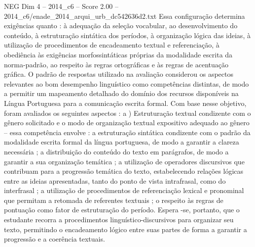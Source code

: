 \begin{textsample}{NEG Dim 4 – 2014\_c6 – Score 2.00 – 2014\_c6/enade\_2014\_arqui\_urb\_dc542636d2.txt}
Essa configuração determina exigências quanto : à adequação da seleção vocabular, ao desenvolvimento do conteúdo, à estruturação sintática dos períodos, à organização lógica das ideias, à utilização de procedimentos de encadeamento textual e referenciação, à obediência às exigências morfossintáticas próprias da modalidade escrita da norma-padrão, ao respeito às regras ortográficas e às regras de acentuação gráfica.
O padrão de respostas utilizado na avaliação considerou os aspectos relevantes ao bom desempenho linguístico como competências distintas, de modo a permitir um mapeamento detalhado do domínio dos recursos disponíveis na Língua Portuguesa para a comunicação escrita formal.
Com base nesse objetivo, foram avaliados os seguintes aspectos : a ) Estruturação textual condizente com o gênero solicitado e o modo de organização textual expositivo adequado ao gênero – essa competência envolve : a estruturação sintática condizente com o padrão da modalidade escrita formal da língua portuguesa, de modo a garantir a clareza necessária ; a distribuição do conteúdo do texto em parágrafos, de modo a garantir a sua organização temática ; a utilização de operadores discursivos que contribuam para a progressão temática do texto, estabelecendo relações lógicas entre as ideias apresentadas, tanto do ponto de vista intrafrasal, como do interfrasal ; a utilização de procedimentos de referenciação lexical e pronominal que permitam a retomada de referentes textuais ; o respeito às regras de pontuação como fator de estruturação do período.
Espera -se, portanto, que o estudante recorra a procedimentos linguístico-discursivos para organizar seu texto, permitindo o encadeamento lógico entre suas partes de forma a garantir a progressão e a coerência textuais.

\end{textsample}
